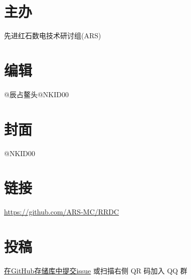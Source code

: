 \documentclass[UTF8,12pt,punct=kaiming,fontset=none]{ctexart}
\begin{document}
\begin{spacing}{1.5}
\begin{minipage}[c]{0.55\linewidth}
    \section*{主办}
    先进红石数电技术研讨组(ARS)

    \section*{编辑}
    @辰占鳌头\hspace{0.5cm}@NKID00

    \section*{封面}
    @NKID00

    \section*{链接}
    \url{https://github.com/ARS-MC/RRDC}

    \section*{投稿}
    \href{https://github.com/ARS-MC/RRDC/issues/new?assignees=&labels=%E6%8A%95%E7%A8%BF&template=contribute.md&title=%E5%9C%A8%E6%AD%A4%E5%A4%84%E5%A1%AB%E5%86%99%E6%A0%87%E9%A2%98}{在GitHub存储库中提交issue} 或扫描右侧 QR 码加入 QQ 群
\end{minipage}
\end{spacing}
\end{document}
